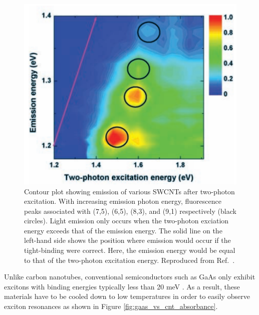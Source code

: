 \begin{figure}[H]
	\centering
	\includegraphics[scale=0.3]{images/chapter_optical_props/two_photon_wang}
	\caption{Contour plot showing emission of various SWCNTs after two-photon excitation. With increasing emission photon energy, fluorescence peaks associated with (7,5), (6,5), (8,3), and (9,1) respectively (black circles). Light emission only occurs when the two-photon exciation energy exceeds that of the emission energy. The solid line on the left-hand side shows the position where emission would occur if the tight-binding were correct. Here, the emission energy would be equal to that of the two-photon excitation energy. Reproduced from Ref.\ \cite{wang2005optical}.}
	\label{fig:cnt_two_photon_emission}
\end{figure}

Unlike carbon nanotubes, conventional semiconductors such as GaAs only exhibit excitons with binding energies typically less than 20 meV \cite{liang1970excitons}.  As a result, these materials have to be cooled down to low temperatures in order to easily observe exciton resonances as shown in Figure \ref{fig:gaas_vs_cnt_absorbance}.

